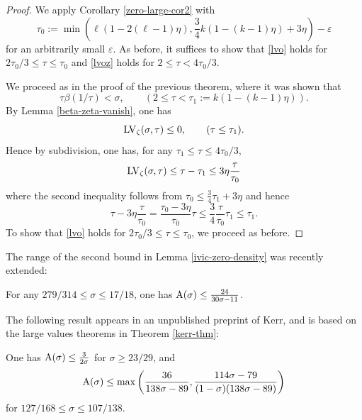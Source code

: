 
\begin{proof}
We apply Corollary \ref{zero-large-cor2} with
\begin{equation}\label{tau0-def1}
\tau_0 := \min( \ell (1 - 2(\ell-1) \eta), \frac{3}{4} k(1 - (k - 1)\eta) + 3\eta) - \varepsilon
\end{equation}
for an arbitrarily small $\varepsilon$.
As before, it suffices to show that \eqref{lvo} holds for $2\tau_0/3 \leq \tau \leq \tau_0$ and \eqref{lvoz} holds for $2 \leq \tau < 4\tau_0/3$.

We proceed as in the proof of the previous theorem, where it was shown that
\[
\tau \beta(1/\tau) < \sigma,\qquad (2 \le \tau < \tau_1 := k(1 - (k - 1)\eta)).
\]
By Lemma \ref{beta-zeta-vanish}, one has
\[
\mathrm{LV}_\zeta(\sigma, \tau) \leq 0,\qquad (\tau \le \tau_1).
\]
Hence by subdivision, one has, for any $\tau_1 \le \tau \le 4\tau_0/3$,
\[
\mathrm{LV}_\zeta(\sigma, \tau) \le \tau - \tau_1 \le 3\eta\frac{\tau}{\tau_0}
\]
where the second inequality follows from $\tau_0 \le \frac{3}{4}\tau_1 + 3\eta$ and hence
\[
\tau - 3\eta\frac{\tau}{\tau_0} = \frac{\tau_0 - 3\eta}{\tau_0}\tau \le \frac{3}{4}\frac{\tau}{\tau_0}\tau_1 \le \tau_1.
\]
To show that \eqref{lvo} holds for $2\tau_0/3 \leq \tau \leq \tau_0$, we proceed as before.
\end{proof}


The range of the second bound in Lemma \ref{ivic-zero-density} was recently extended:

\begin{theorem}\label{cdv-density}\cite{chen_debruyne_vindas_density_2024}  For any $279/314 \leq \sigma \leq 17/18$, one has $\mathrm{A}(\sigma) \leq \frac{24}{30\sigma-11}$.
\end{theorem}
\literature
{}

The following result appears in an unpublished preprint of Kerr, and is based on the large values theorems in Theorem \ref{kerr-thm}:

\begin{proposition}\label{kerr-prop}\cite[Theorems 6, 7]{kerr} One has $\mathrm{A}(\sigma) \leq \frac{3}{2\sigma}$ for $\sigma \geq 23/29$, and
$$\mathrm{A}(\sigma) \leq \max\left( \frac{36}{138\sigma-89}, \frac{114\sigma-79}{(1-\sigma)(138\sigma-89)} \right)$$
for $127/168 \leq \sigma \leq 107/138$.
\end{proposition}

